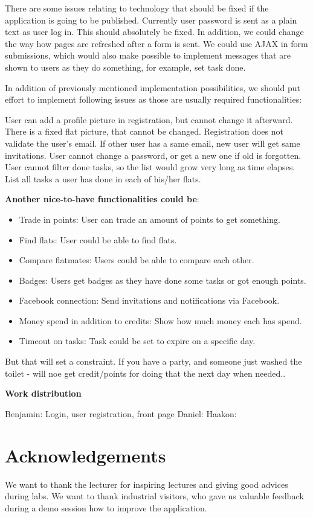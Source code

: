 \documentclass{sig-alt-release2}
\begin{document}
There are some issues relating to technology that should be fixed if the application is going to be published. Currently user password is sent as a plain text as user log in. This should absolutely be fixed. In addition, we could change the way how pages are refreshed after a form is sent. We could use AJAX in form submissions, which would also make possible to implement messages that are shown to users as they do something, for example, set task done.

In addition of previously mentioned implementation possibilities, we should put effort to implement following issues as those are usually required functionalities:

User can add a profile picture in registration, but cannot change it afterward.
There is a fixed flat picture, that cannot be changed.
Registration does not validate the user’s email. If other user has a same email, new user will get same invitations.
User cannot change a password, or get a new one if old is forgotten.
User cannot filter done tasks, so the list would grow very long as time elapses.
List all tasks a user has done in each of his/her flats.

\textbf{Another nice-to-have functionalities could be}:
\begin{itemize}
\item Trade in points: User can trade an amount of points to get something.
\item Find flats: User could be able to find flats.
\item Compare flatmates: Users could be able to compare each other.
\item Badges: Users get badges as they have done some tasks or got enough points.
\item Facebook connection: Send invitations and notifications via Facebook.
\item Money spend in addition to credits: Show how much money each has spend.
\item Timeout on tasks: Task could be set to expire on a specific day.
\end{itemize}
But that will set a constraint. If you have a party, and someone just washed the toilet - will noe get credit/points for doing that the next day when needed..

\textbf{Work distribution}

Benjamin: Login, user registration, front page
Daniel:
Haakon:

\section{Acknowledgements}

We want to thank the lecturer for inspiring lectures and giving good advices during labs.
We want to thank industrial visitors, who gave us valuable feedback during a demo session how to improve the application.



\end{document}
